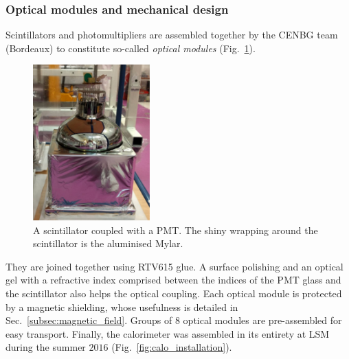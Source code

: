 \subsubsection*{Optical modules and mechanical design}

Scintillators and photomultipliers are assembled together by the CENBG team (Bordeaux) to constitute so-called \emph{optical modules} (Fig.~\ref{fig:scintillator_PMT}).
\begin{figure}[h!]
\centering
\includegraphics[width=0.4\textwidth]{SNdemonstrator/fig_SNdemonstrator/scintillator_wrap.pdf}
\caption{A scintillator coupled with a PMT.
  The shiny wrapping around the scintillator is the aluminised Mylar.
\label{fig:scintillator_PMT}}
\end{figure}
They are joined together using RTV615 glue.
A surface polishing and an optical gel with a refractive index comprised between the indices of the PMT glass and the scintillator also helps the optical coupling.
Each optical module is protected by a magnetic shielding, whose usefulness is detailed in Sec.~\ref{subsec:magnetic_field}.
Groups of $8$ optical modules are pre-assembled for easy transport.
Finally, the calorimeter was assembled in its entirety at LSM during the summer $2016$ (Fig.~\ref{fig:calo_installation}).
